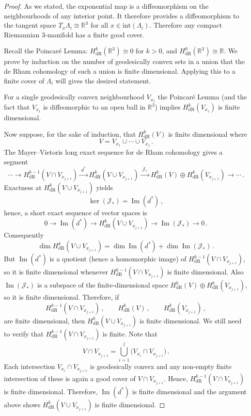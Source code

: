 \documentclass[11pt]{article}
\theoremstyle{plain}
\theoremstyle{definition}
\theoremstyle{remark}
\newcommand{\R}{\mathbb{R}}
\newcommand{\ST}{\Lambda}
\begin{document}
\begin{proof}
As we stated, the exponential map is a diffeomorphism on the neighbourhoods of any interior point. It therefore provides a diffeomorphism to the tangent space \(T_x \ST_i \cong \R^3\) for all \(x \in \text{int} (\ST_i)\). Therefore any compact Riemannian 3-manifold has a finite good cover.





Recall the Poincaré Lemma: \(H^k_{\mathrm{dR}}(\mathbb{R}^3)\cong 0 \) for \(k>0\), and \(H^0_{\mathrm{dR}}(\mathbb{R}^3)\cong\mathbb{R}\). We prove by induction on the number of geodesically convex sets in a union that the de Rham cohomology of such a union is finite dimensional. Applying this to a finite cover of \(\ST_i\) will gives the desired statement.

For a single geodesically convex neighbourhood \(V_{x_1}\) the Poincaré Lemma (and the fact that \(V_{x_1}\) is diffeomorphic to an open ball in \(\mathbb{R}^3\)) implies \(H^k_{\mathrm{dR}}(V_{x_1})\) is finite dimensional.

Now suppose, for the sake of induction, that \(H^k_{\mathrm{dR}}(V)\) is finite dimensional where
\[
V=V_{x_1}\cup\cdots\cup V_{x_j} \, .
\]
The Mayer–Vietoris long exact sequence for de Rham cohomology gives a segment
\[
\cdots \longrightarrow
H^{k-1}_{\mathrm{dR}}(V\cap V_{x_{j+1}})
\xrightarrow{\;d^*\;}
H^{k}_{\mathrm{dR}}(V\cup V_{x_{j+1}})
\xrightarrow{\;\mathcal{J}_*\;}
H^{k}_{\mathrm{dR}}(V)\oplus H^{k}_{\mathrm{dR}}(V_{x_{j+1}})
\longrightarrow\cdots \, .
\]
Exactness at \(H^{k}_{\mathrm{dR}}(V\cup V_{x_{j+1}})\) yields
\[
\ker(\mathcal{J}_*)=\operatorname{Im}(d^*) \, ,
\]
hence, a short exact sequence of vector spaces is
\[
0 \longrightarrow \operatorname{Im}(d^*) \longrightarrow
H^{k}_{\mathrm{dR}}(V\cup V_{x_{j+1}}) \longrightarrow
\operatorname{Im}(\mathcal{J}_*) \longrightarrow 0 \, .
\]
Consequently
\[
\dim H^{k}_{\mathrm{dR}}(V\cup V_{x_{j+1}})
= \dim\operatorname{Im}(d^*) + \dim\operatorname{Im}(\mathcal{J}_*) \, .
\]
But \(\operatorname{Im}(d^*)\) is a quotient (hence a homomorphic image) of \(H^{k-1}_{\mathrm{dR}}(V\cap V_{x_{j+1}})\), so it is finite dimensional whenever \(H^{k-1}_{\mathrm{dR}}(V\cap V_{x_{j+1}})\) is finite dimensional. Also \(\operatorname{Im}(\mathcal{J}_*)\) is a subspace of the finite-dimensional space \(H^{k}_{\mathrm{dR}}(V)\oplus H^{k}_{\mathrm{dR}}(V_{x_{j+1}})\), so it is finite dimensional. Therefore, if
\[
H^{k-1}_{\mathrm{dR}}(V\cap V_{x_{j+1}}) \, ,\qquad
H^{k}_{\mathrm{dR}}(V) \, ,\qquad
H^{k}_{\mathrm{dR}}(V_{x_{j+1}}) \, , 
\]
are finite dimensional, then \(H^{k}_{\mathrm{dR}}(V\cup V_{x_{j+1}})\) is finite dimensional. We still need to verify that \(H^{k-1}_{\mathrm{dR}}(V\cap V_{x_{j+1}})\) is finite. Note that
\[
V\cap V_{x_{j+1}}
=\bigcup_{i=1}^j \bigl(V_{x_i}\cap V_{x_{j+1}}\bigr) \, .
\]
Each intersection \(V_{x_i}\cap V_{x_{j+1}}\) is geodesically convex and any non-empty finite intersection of these is again a good cover of \(V\cap V_{x_{j+1}}\). Hence, \(H^{k-1}_{\mathrm{dR}}(V\cap V_{x_{j+1}})\) is finite dimensional. Therefore, \(\operatorname{Im}(d^*)\) is finite dimensional and the argument above shows \(H^{k}_{\mathrm{dR}}(V\cup V_{x_{j+1}})\) is finite dimensional.


\end{proof}
\end{document}
